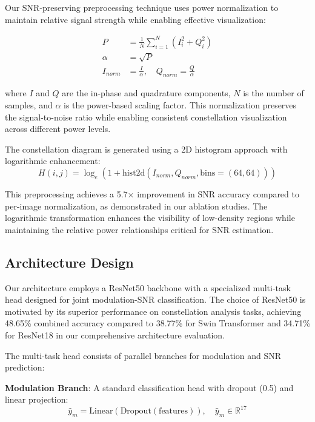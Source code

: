 \documentclass{ELSP}
\begin{document}
Our SNR-preserving preprocessing technique uses power normalization to maintain relative signal strength while enabling effective visualization:

\begin{equation}
\begin{aligned}
P &= \frac{1}{N} \sum_{i=1}^{N} (I_i^2 + Q_i^2) \\
\alpha &= \sqrt{P} \\
I_{norm} &= \frac{I}{\alpha}, \quad Q_{norm} = \frac{Q}{\alpha}
\end{aligned}
\end{equation}

where $I$ and $Q$ are the in-phase and quadrature components, $N$ is the number of samples, and $\alpha$ is the power-based scaling factor. This normalization preserves the signal-to-noise ratio while enabling consistent constellation visualization across different power levels.

The constellation diagram is generated using a 2D histogram approach with logarithmic enhancement:
\begin{equation}
H(i,j) = \log_e(1 + \text{hist2d}(I_{norm}, Q_{norm}, \text{bins}=(64,64)))
\end{equation}

This preprocessing achieves a 5.7× improvement in SNR accuracy compared to per-image normalization, as demonstrated in our ablation studies. The logarithmic transformation enhances the visibility of low-density regions while maintaining the relative power relationships critical for SNR estimation.

\subsection{Architecture Design}

Our architecture employs a ResNet50 backbone with a specialized multi-task head designed for joint modulation-SNR classification. The choice of ResNet50 is motivated by its superior performance on constellation analysis tasks, achieving 48.65\% combined accuracy compared to 38.77\% for Swin Transformer and 34.71\% for ResNet18 in our comprehensive architecture evaluation.

The multi-task head consists of parallel branches for modulation and SNR prediction:

\textbf{Modulation Branch}: A standard classification head with dropout (0.5) and linear projection:
\begin{equation}
\hat{y}_m = \text{Linear}(\text{Dropout}(\text{features})), \quad \hat{y}_m \in \mathbb{R}^{17}
\end{equation}
\end{document}
